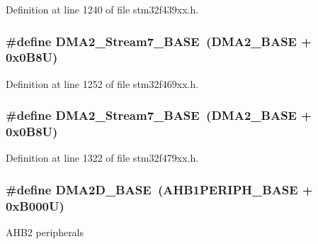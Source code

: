Definition at line 1240 of file stm32f439xx.\+h.

\subsubsection[{\texorpdfstring{D\+M\+A2\+\_\+\+Stream7\+\_\+\+B\+A\+SE}{DMA2_Stream7_BASE}}]{\setlength{\rightskip}{0pt plus 5cm}\#define D\+M\+A2\+\_\+\+Stream7\+\_\+\+B\+A\+SE~({\bf D\+M\+A2\+\_\+\+B\+A\+SE} + 0x0\+B8\+U)}\hypertarget{group___peripheral__memory__map_gaa9faa708ad2440d24eb1064cba9bb06d}{}\label{group___peripheral__memory__map_gaa9faa708ad2440d24eb1064cba9bb06d}


Definition at line 1252 of file stm32f469xx.\+h.

\subsubsection[{\texorpdfstring{D\+M\+A2\+\_\+\+Stream7\+\_\+\+B\+A\+SE}{DMA2_Stream7_BASE}}]{\setlength{\rightskip}{0pt plus 5cm}\#define D\+M\+A2\+\_\+\+Stream7\+\_\+\+B\+A\+SE~({\bf D\+M\+A2\+\_\+\+B\+A\+SE} + 0x0\+B8\+U)}\hypertarget{group___peripheral__memory__map_gaa9faa708ad2440d24eb1064cba9bb06d}{}\label{group___peripheral__memory__map_gaa9faa708ad2440d24eb1064cba9bb06d}


Definition at line 1322 of file stm32f479xx.\+h.

\subsubsection[{\texorpdfstring{D\+M\+A2\+D\+\_\+\+B\+A\+SE}{DMA2D_BASE}}]{\setlength{\rightskip}{0pt plus 5cm}\#define D\+M\+A2\+D\+\_\+\+B\+A\+SE~({\bf A\+H\+B1\+P\+E\+R\+I\+P\+H\+\_\+\+B\+A\+SE} + 0x\+B000\+U)}\hypertarget{group___peripheral__memory__map_gacec66385fd1604e69584eb19a0aaa303}{}\label{group___peripheral__memory__map_gacec66385fd1604e69584eb19a0aaa303}
A\+H\+B2 peripherals 

